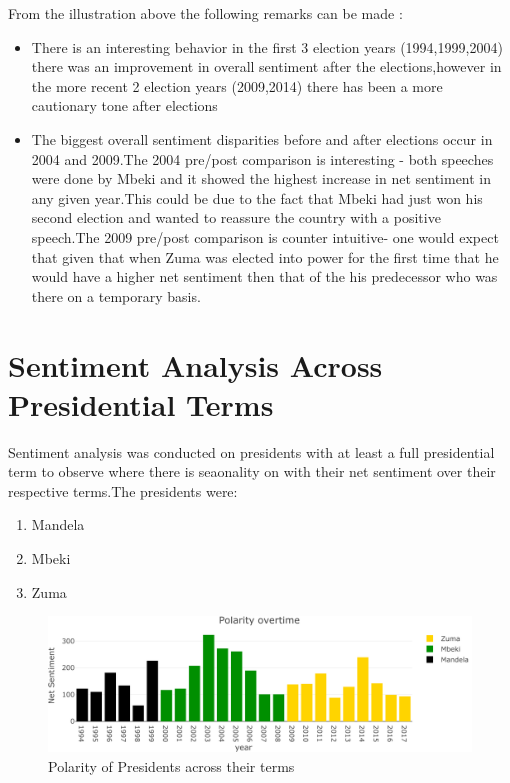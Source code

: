 \documentclass[]{article}
\begin{document}
From the illustration above the following remarks can be made :

\begin{itemize}

\item There is an interesting behavior in the first 3 election years (1994,1999,2004) there was an improvement in overall sentiment after the elections,however in the more recent 2 election years (2009,2014) there has been a more cautionary tone after elections  
\item The biggest  overall sentiment disparities before and after elections occur in 2004 and 2009.The 2004 pre/post comparison is interesting - both speeches were done by Mbeki and it showed the highest increase in net sentiment in any given year.This could be due to the fact that Mbeki had just won his second election and wanted to reassure the country with a positive speech.The 2009 pre/post comparison is counter intuitive-  one would expect that given that when Zuma was elected into power for the first time that he would have a higher net sentiment then that of the his predecessor who was there on a temporary basis.

\end{itemize}

\section{Sentiment Analysis Across Presidential Terms}

Sentiment analysis was conducted on presidents with at least a full
presidential term to observe where there is seaonality on with their net
sentiment over their respective terms.The presidents were:

\begin{enumerate}
\item Mandela
\item Mbeki
\item Zuma
\end{enumerate}

\begin{figure}[H]

{\centering \includegraphics{datasci_fi_Assignment_2_files/figure-latex/Mandela_Mbeki_Zuma-1} 

}

\caption{Polarity of Presidents across their terms}\label{fig:Mandela_Mbeki_Zuma}
\end{figure}
\end{document}
